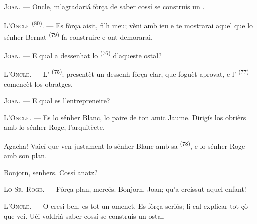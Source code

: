 %
%

\VUsaut{6.0mm}
\VUsaut{1.4mm}
\VUsaut{2.2mm}

\VUsaut{3.0mm}

\textsc{Joan}. --- Oncle, m'agradariá fòrça de saber cossí se construís un
.

\textsc{L'Oncle} \textsuperscript{(80)}. --- Es fòrça aisit, filh meu; vèni amb
ieu e te mostrarai aquel que lo sénher Bernat \textsuperscript{(79)} fa
construire e ont demorarai.

\textsc{Joan}. --- E qual a dessenhat lo  \textsuperscript{(76)}
d'aqueste ostal?

\textsc{L'Oncle}. --- L' \textsuperscript{(75)}; presentèt un
dessenh fòrça clar, que foguèt aprovat, e l'
\textsuperscript{(77)} comencèt los obratges.

\textsc{Joan}. --- E qual es l'entrepreneire?

\textsc{L'Oncle}. --- Es lo sénher Blanc, lo paire de ton amic Jaume. Dirigís los
obrièrs amb lo sénher Roge, l'arquitècte.

Agacha! Vaicí que ven justament lo sénher Blanc amb sa 
\textsuperscript{(78)}, e lo sénher Roge amb son plan.

Bonjorn, senhers. Cossí anatz?

\textsc{Lo Sr. Roge}. --- Fòrça plan, mercés. Bonjorn, Joan; qu'a creissut aquel
enfant!

\textsc{L'Oncle}. --- O cresi ben, es tot un omenet. Es fòrça seriós; li cal
explicar tot çò que vei. Uèi voldriá saber cossí se construís un ostal.

